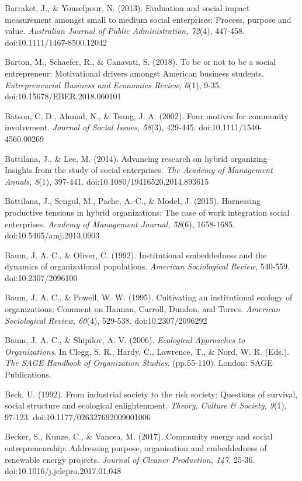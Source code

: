 \documentclass{article}
\begin{document}
Barraket, J., \& Yousefpour, N. (2013). Evaluation and social impact measurement amongst small to medium social enterprises: Process, purpose and value. \emph{Australian Journal of Public Administration, 72}(4), 447-458. doi:10.1111/1467-8500.12042

Barton, M., Schaefer, R., \& Canavati, S. (2018). To be or not to be a social entrepreneur: Motivational drivers amongst American business students. \emph{Entrepreneurial Business and Economics Review, 6}(1), 9-35. doi:10.15678/EBER.2018.060101

Batson, C. D., Ahmad, N., \& Tsang, J. A. (2002). Four motives for community involvement. \emph{Journal of Social Issues, 58}(3), 429-445. doi:10.1111/1540-4560.00269

Battilana, J., \& Lee, M. (2014). Advancing research on hybrid organizing--Insights from the study of social enterprises. \emph{The Academy of Management Annals, 8}(1), 397-441. doi:10.1080/19416520.2014.893615

Battilana, J., Sengul, M., Pache, A.-C., \& Model, J. (2015). Harnessing productive tensions in hybrid organizations: The case of work integration social enterprises. \emph{Academy of Management Journal, 58}(6), 1658-1685. doi:10.5465/amj.2013.0903

Baum, J. A. C., \& Oliver, C. (1992). Institutional embeddedness and the dynamics of organizational populations. \emph{American Sociological Review}, 540-559. doi:10.2307/2096100

Baum, J. A. C., \& Powell, W. W. (1995). Cultivating an institutional ecology of organizations: Comment on Hannan, Carroll, Dundon, and Torres. \emph{American Sociological Review, 60}(4), 529-538. doi:10.2307/2096292

Baum, J. A. C., \& Shipilov, A. V. (2006). \emph{Ecological Approaches to Organizations}. In Clegg, S. R., Hardy, C., Lawrence, T., \& Nord, W. R. (Eds.). \emph{The SAGE Handbook of Organization Studies}. (pp.55-110). London: SAGE Publications.

Beck, U. (1992). From industrial society to the risk society: Questions of survival, social structure and ecological enlightenment. \emph{Theory, Culture \& Society, 9}(1), 97-123. doi:10.1177/026327692009001006

Becker, S., Kunze, C., \& Vancea, M. (2017). Community energy and social entrepreneurship: Addressing purpose, organisation and embeddedness of renewable energy projects. \emph{Journal of Cleaner Production, 147}, 25-36. doi:10.1016/j.jclepro.2017.01.048
\end{document}
